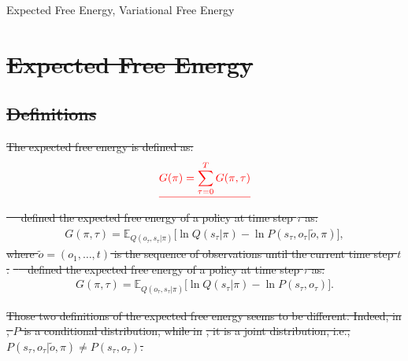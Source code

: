 \documentclass[twoside,11pt]{article}
\providecommand{\DIFdel}[1]{{\protect\color{red}\sout{#1}}}                      %
\providecommand{\DIFdelbegin}{} %
\begin{document}
\begin{keywords}
Expected Free Energy, Variational Free Energy
\end{keywords}

\DIFdelbegin \section{\DIFdel{Expected Free Energy}} %
\addtocounter{section}{-1}%

\subsection{\DIFdel{Definitions}}
\addtocounter{subsection}{-1}%

\DIFdel{The expected free energy is defined as:
}\begin{align*}
\DIFdel{G(\pi) = \sum_{\tau=0}^T G(\pi, \tau)
}\end{align*}%
\DIFdel{\mbox{%
\citet{FRISTON2016862} }\hspace{0pt}
defined the expected free energy of a policy at time step $\tau$ as:
}
\begin{align*}
G(\pi, \tau) = \mathbb{E}_{Q(o_\tau, s_\tau|\pi)}\big[\ln Q(s_\tau|\pi) - \ln P(s_\tau, o_\tau|\tilde{o}, \pi)\big],
\end{align*}%
\DIFdel{where $\tilde{o} = (o_1, \hdots, t)$ is the sequence of observations until the current time step $t$.
}%
\DIFdel{\mbox{%
\citet{Parr304782} }\hspace{0pt}
defined the expected free energy of a policy at time step $\tau$ as:}
\begin{align*}
G(\pi, \tau) = \mathbb{E}_{Q(o_\tau, s_\tau|\pi)}\big[\ln Q(s_\tau|\pi) - \ln P(s_\tau, o_\tau)\big].
\end{align*}

\DIFdel{Those two definitions of the expected free energy seems to be different. Indeed, in }
\DIFdel{, $P$ is a conditional distribution, while in }%
\DIFdel{, it is a joint distribution, i.e., $P(s_\tau, o_\tau|\tilde{o}, \pi) \neq P(s_\tau, o_\tau)$.
}%
\end{document}
